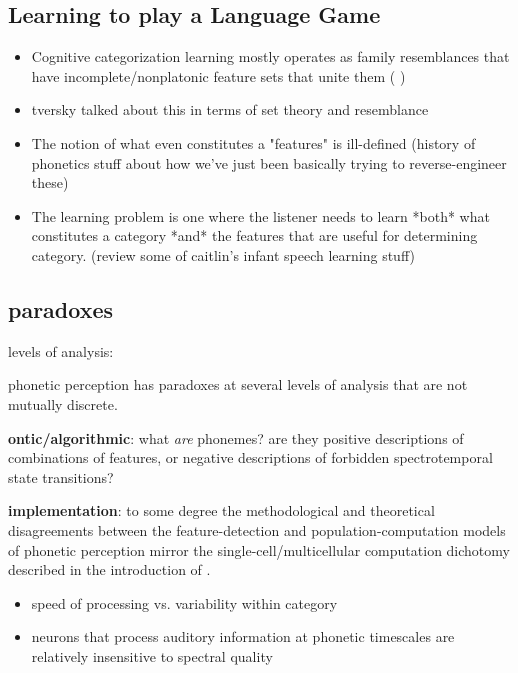 \begin{multicols}{2}
\begin{itemize}
\end{itemize}

\subsection{Learning to play a Language Game}

\begin{itemize}
	\item Cognitive categorization learning mostly operates as family resemblances that have incomplete/nonplatonic feature sets that unite them (\cite{roschFamilyResemblancesStudies1975}\cite{roschWittgensteinCategorizationResearch1987} \cite{couchmanRulesResemblanceTheir2010})
	\item tversky talked about this in terms of set theory and resemblance \cite{tverskyStudiesSimilarity1978} \cite{Tversky1970}
	\item The notion of what even constitutes a "features" is ill-defined (history of phonetics stuff about how we've just been basically trying to reverse-engineer these)
	\item The learning problem is one where the listener needs to learn *both* what constitutes a category *and* the features that are useful for determining category. (review some of caitlin's infant speech learning stuff)
\end{itemize}

\subsection{paradoxes}

levels of analysis:

phonetic perception has paradoxes at several levels of analysis that are not mutually discrete.

\textbf{ontic/algorithmic}: what \textit{are} phonemes? are they positive descriptions of combinations of features, or negative descriptions of forbidden spectrotemporal state transitions?

\textbf{implementation}: to some degree the methodological and theoretical disagreements between the feature-detection and population-computation models of phonetic perception mirror the single-cell/multicellular computation dichotomy described in the introduction of \cite{dubreuilComplementaryRolesDimensionality2020}. 

\begin{itemize}
	\item speed of processing vs. variability within category
	\item neurons that process auditory information at phonetic timescales are relatively insensitive to spectral quality \cite{norman-haignereHierarchicalIntegrationMultiple2020}
\end{itemize}


\end{multicols}
